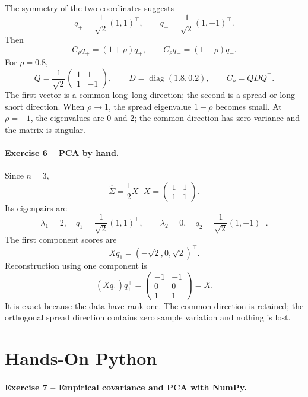 \documentclass[10pt]{article}
\newcommand{\diag}{\operatorname{diag}}
\begin{document}
The symmetry of the two coordinates suggests
\[
q_+=\frac1{\sqrt2}(1,1)^\top,\qquad
q_-=\frac1{\sqrt2}(1,-1)^\top.
\]
Then
\[
C_\rho q_+=(1+\rho)q_+,
\qquad
C_\rho q_-=(1-\rho)q_-.
\]
For $\rho=0.8$,
\[
Q=\frac1{\sqrt2}\begin{pmatrix}1&1\\1&-1\end{pmatrix},
\qquad D=\diag(1.8,0.2),\qquad C_\rho=QDQ^\top.
\]
The first vector is a common long--long direction; the second is a spread or
long--short direction. When $\rho\to1$, the spread eigenvalue $1-\rho$ becomes
small. At $\rho=-1$, the eigenvalues are $0$ and $2$; the common direction has
zero variance and the matrix is singular.

\paragraph{Exercise 6 -- PCA by hand.}

Since $n=3$,
\[
\widehat\Sigma=\frac12X^\top X
=\begin{pmatrix}1&1\\1&1\end{pmatrix}.
\]
Its eigenpairs are
\[
\lambda_1=2,\quad q_1=\frac1{\sqrt2}(1,1)^\top,
\qquad
\lambda_2=0,\quad q_2=\frac1{\sqrt2}(1,-1)^\top.
\]
The first component scores are
\[
Xq_1=(-\sqrt2,0,\sqrt2)^\top.
\]
Reconstruction using one component is
\[
(Xq_1)q_1^\top
=\begin{pmatrix}-1&-1\\0&0\\1&1\end{pmatrix}=X.
\]
It is exact because the data have rank one. The common direction is retained;
the orthogonal spread direction contains zero sample variation and nothing is
lost.

\section{Hands-On Python}

\paragraph{Exercise 7 -- Empirical covariance and PCA with NumPy.}
\end{document}
